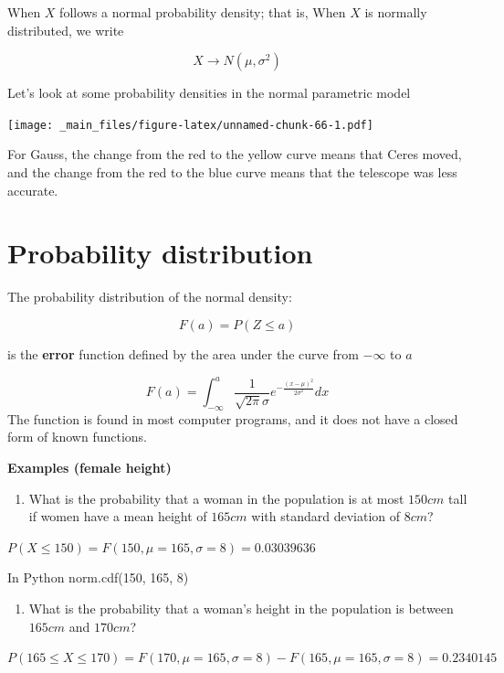 \documentclass[
]{book}
\providecommand{\tightlist}{%
  \setlength{\itemsep}{0pt}\setlength{\parskip}{0pt}}
\begin{document}
When \(X\) follows a normal probability density; that is, When \(X\) is normally distributed, we write

\[X\rightarrow N(\mu,\sigma^2)\]

Let's look at some probability densities in the normal parametric model

\texttt{[image: \_main\_files/figure-latex/unnamed-chunk-66-1.pdf]}

For Gauss, the change from the red to the yellow curve means that Ceres moved, and the change from the red to the blue curve means that the telescope was less accurate.

\hypertarget{probability-distribution-2}{%
\section{Probability distribution}\label{probability-distribution-2}}

The probability distribution of the normal density:

\[F(a)=P(Z \leq a)\]

is the \textbf{error} function defined by the area under the curve from \(-\infty\) to \(a\)

\[F(a)=\int_{-\infty}^{a}\frac{1}{\sqrt{2\pi}\sigma}e^{-\frac{(x-\mu)^2}{2\sigma^2}} dx\]
The function is found in most computer programs, and it does not have a closed form of known functions.

\textbf{Examples (female height)}

\begin{enumerate}
\def\labelenumi{\arabic{enumi})}
\tightlist
\item
  What is the probability that a woman in the population is at most \(150cm\) tall if women have a mean height of \(165cm\) with standard deviation of \(8cm\)?
\end{enumerate}

\(P(X\le 150)=F(150, \mu=165, \sigma=8)=0.03039636\)

In Python norm.cdf(150, 165, 8)

\begin{enumerate}
\def\labelenumi{\arabic{enumi})}
\setcounter{enumi}{1}
\tightlist
\item
  What is the probability that a woman's height in the population is between \(165cm\) and \(170cm\)?
\end{enumerate}

\(P(165 \le X \le 170)=F(170, \mu=165, \sigma=8)-F(165, \mu=165, \sigma=8)=0.2340145\)
\end{document}
